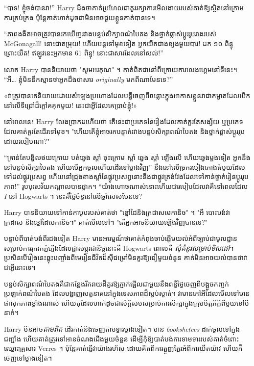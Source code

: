 “បាទ! ខ្ញុំចង់បានវា!” Harry ដឹង​ថា​គាត់​ប្រហែល​ជា​គួរ​រក្សា​ការ​មើលងាយ​របស់​គាត់​ឱ្យ​ស្ថិត​នៅ​ក្រោម​ការ​គ្រប់​គ្រង ប៉ុន្តែ​គាត់​ហាក់​ដូច​ជា​មិន​អាច​ជួយ​ខ្លួន​គាត់​បាន​ទេ។

“ភាពងងឹតអាចត្រូវបានរកឃើញរវាងបន្ទប់សិក្សាពណ៌បៃតង និងថ្នាក់ផ្លាស់ប្តូររូបរាងរបស់ McGonagall! នោះ​ជា​តម្រុយ! ហើយបន្តទៅមុខទៀត អ្នកយឺតជាងខ្យងមួយបាវ! ដក ១០ ពិន្ទុព្រោះយឺត! ឥឡូវនេះអ្នកមាន 61 ពិន្ទុ! នោះជាសារដែលនៅសល់!”

លោក Harry បាននិយាយថា "សូមអរគុណ" ។ គាត់ពិតជានៅពីក្រោយការលេងហ្គេមនៅទីនេះ។ “អឺ… ខ្ញុំមិននឹកស្មានថាអ្នកដឹងថាសារ \emph{originally} មកពីណាមែនទេ?”

«វា​ត្រូវ​បាន​គេ​និយាយ​ដោយ​សំឡេង​ប្រហោង​ដែល​បន្លឺ​ចេញ​ពី​ចន្លោះ​ក្នុង​អាកាស​ខ្លួន​វា​ជា​គម្លាត​ដែល​បើក​នៅ​លើ​ទីជ្រៅ​ដ៏​ក្ដៅ​គគុក​មួយ! នេះ​ជា​អ្វី​ដែល​គេ​ប្រាប់​ខ្ញុំ!»

នៅពេលនេះ Harry លែងប្រាកដហើយថា តើនេះជាប្រភេទនៃរឿងដែលគាត់គួរតែសង្ស័យ ឬប្រភេទដែលគាត់គួរតែដើរទៅមុខ។ "ហើយតើខ្ញុំអាចរកបន្ទាត់រវាងបន្ទប់សិក្សាពណ៌បៃតង និងថ្នាក់ផ្លាស់ប្តូររូបដោយរបៀបណា?"

“គ្រាន់តែបង្វិលថយក្រោយ បត់ឆ្វេង ស្តាំ ចុះក្រោម ស្តាំ ឆ្វេង ស្តាំ ឡើងលើ ហើយឆ្វេងម្តងទៀត អ្នកនឹងនៅបន្ទប់សិក្សាបៃតង ហើយបើអ្នកចូលហើយដើរទៅម្ខាងវិញ” នឹង​នៅ​លើ​ច្រក​របៀង​កោង​ធំ​មួយ​ដែល​ទៅ​ដល់​ផ្លូវ​ប្រសព្វ ហើយ​នៅ​ជ្រុង​ខាងស្តាំ​នៃ​ផ្លូវ​ប្រសព្វ​នោះ​នឹង​ជា​ផ្លូវ​ត្រង់​វែង​ដែល​ទៅ​កាន់​ថ្នាក់​រៀន​ប្តូរ​រូប​ភាព!” រូប​បុរស​វ័យ​កណ្តាល​បាន​ផ្អាក។ “យ៉ាងហោចណាស់នោះហើយជារបៀបដែលវាគឺនៅពេលដែល \emph{I} នៅ Hogwarts ។ នេះ\emph{គឺ}ថ្ងៃច័ន្ទនៅលើឆ្នាំសេសមែនទេ?

Harry បាននិយាយទៅកាន់កាបូបរបស់គាត់ថា "ខ្មៅដៃនិងក្រដាសមេកានិច" ។ "អឺ បោះបង់វា ក្រដាស និងខ្មៅដៃមេកានិច។" គាត់មើលទៅ។ "តើអ្នកអាចនិយាយឡើងវិញបានទេ?"

បន្ទាប់ពីបាត់បង់ពីរដងទៀត Harry មានអារម្មណ៍ថាគាត់កំពុងចាប់ផ្តើមយល់អំពីច្បាប់ជាមូលដ្ឋានសម្រាប់ការរុករកភ្នំភ្លើងដែលផ្លាស់ប្តូរជានិច្ចនោះគឺ Hogwarts ពោលគឺ \emph{សុំគំនូរសម្រាប់ទិសដៅ}។ ប្រសិនបើរឿងនេះឆ្លុះបញ្ចាំងពីមេរៀនជីវិតដ៏ស៊ីជម្រៅមិនគួរឱ្យជឿមួយចំនួន គាត់មិនអាចយល់បានថាវាជាអ្វីនោះទេ។

បន្ទប់សិក្សាពណ៌បៃតងគឺជាកន្លែងរីករាយដ៏គួរឱ្យភ្ញាក់ផ្អើលជាមួយនឹងពន្លឺថ្ងៃចេញពីបង្អួចកញ្ចក់ប្រឡាក់ពណ៌បៃតង ដែលបង្ហាញសត្វនាគនៅក្នុងទេសភាពដ៏ស្ងប់ស្ងាត់។ វា​មាន​កៅអី​ដែល​មើល​ទៅ​មាន​ផាសុកភាព​ខ្លាំង​ណាស់ ហើយ​តុ​ដែល​ហាក់​ដូចជា​ស័ក្តិសម​សម្រាប់​ការ​សិក្សា​ក្នុង​ក្រុម​មិត្តភ័ក្តិ​ពី​មួយ​ទៅ​បី​នាក់។

Harry មិន​អាច​\emph{តាម​ពិត​} ដើរ​កាត់​និង​ចេញ​តាម​ទ្វារ​ម្ខាង​ទៀត។ មាន \emph{bookshelves} ដាក់ចូលទៅក្នុងជញ្ជាំង ហើយគាត់ត្រូវទៅអានចំណងជើងមួយចំនួន ដើម្បីកុំឱ្យបាត់បង់ការទាមទាររបស់គាត់ចំពោះឈ្មោះគ្រួសារ Verres ។ ប៉ុន្តែ​គាត់​ធ្វើ​វា​យ៉ាង​រហ័ស ដោយ​គិត​ពី​ការ​ត្អូញត្អែរ​អំពី​ការ​យឺតយ៉ាវ ហើយ​ក៏​ចេញ​ទៅ​ម្ខាង​ទៀត។


